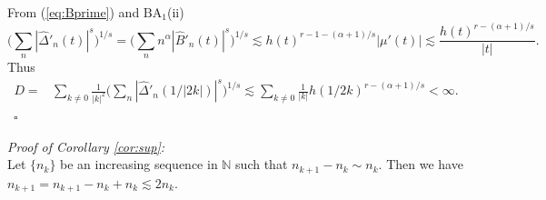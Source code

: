 \documentclass[11pt]{amsart}
\theoremstyle{definition}
\theoremstyle{remark}
\begin{document}
From (\ref{eq:Bprime}) and $\text{BA}_1$(ii) 
\begin{equation} \Big( \sum_n  |\hat\Delta'_n(t )|^s\Big)^{1/s} = 
\Big( \sum_n n^{\alpha}  |\hat B'_n(t )|^s\Big)^{1/s}
 \lesssim  h(t)^{r-1-(\alpha+1)/s} |\mu'(t)| \lesssim \frac{h(t)^{r-(\alpha+1)/s}}{|t|}.\label{eqn:C}
 \end{equation}
Thus
\begin{align*}
D = & \sum_{k\neq 0} \frac 1{|k|^2}
\Big(    \sum_n   |\hat\Delta'_n(1/|2k| )|^s  \Big)^{1/s} %
   \lesssim      \sum_{k\neq 0} \frac 1{|k|}   h(1/2k)^{r - (\alpha+1)/s}  <\infty.  
\end{align*}~\hfill$\square$
  \bigskip
  
  \noindent \textit{ Proof of Corollary \ref{cor:sup}:}\\
  Let $\{n_k\}$ be an increasing sequence in $\mathbb N$ such that $n_{k+1}-n_k\sim n_k$.  Then we have $n_{k+1}=n_{k+1}-n_k+n_k\lesssim 2n_k$.
\end{document}
